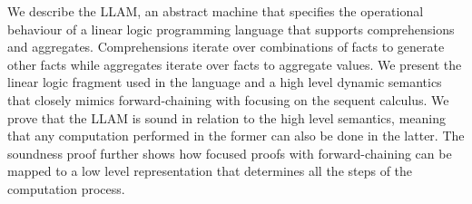 We describe the LLAM, an abstract machine that specifies the operational
behaviour of a linear logic programming language that supports comprehensions
and aggregates. Comprehensions iterate over combinations of facts to generate
other facts while aggregates iterate over facts to aggregate values. We present
the linear logic fragment used in the language and a high level dynamic
semantics that closely mimics forward-chaining with focusing on the sequent
calculus.  We prove that the LLAM is sound in relation to the high level
semantics, meaning that any computation performed in the former can also be done
in the latter. The soundness proof further shows how focused proofs with
forward-chaining can be mapped to a low level representation that determines all
the steps of the computation process.
